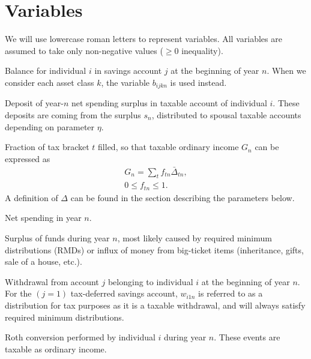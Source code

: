 \documentclass{report}[fleqn,12pt]
\begin{document}
\section{Variables}
We will use lowercase roman letters to represent variables. All variables are assumed
to take only non-negative values ($\ge 0$ inequality).
\begin{description}[leftmargin=4em,style=multiline]
\item [$b_{ijn}$]
	Balance for individual $i$ in savings account $j$ at the beginning of year $n$.
	When we consider each asset class $k$, the variable $b_{ijkn}$ is used instead.
\item [$d_{in}$]
	Deposit of year-$n$ net spending surplus in taxable account of individual $i$.
	These deposits are coming from the surplus $s_n$, distributed to
	spousal taxable accounts depending on parameter $\eta$.
\item [$f_{t n}$]
	Fraction of tax bracket $t$ filled, so that taxable ordinary income $G_n$ can be expressed as
	\begin{eqnarray}
		\label{Eq:Tx1}
		G_n = \sum_t f_{t n}\bar{\Delta}_{t n},\\
		0 \leq f_{t n} \leq 1.
	\end{eqnarray}
	A definition of $\Delta$ can be found in the section describing the parameters below. 
\item [$g_n$]
	Net spending in year $n$.
\item [$s_{n}$]
	Surplus of funds during year $n$, most likely caused by required minimum distributions (RMDs)
	or influx of money from big-ticket items (inheritance, gifts, sale of a house, etc.).
\item [$w_{ijn}$]
	Withdrawal from account $j$ belonging to individual $i$ at the beginning of year $n$.
	For the $(j=1)$ tax-deferred savings account, $w_{i1n}$ is referred to as a distribution for
	tax purposes as it is a taxable withdrawal, and will always satisfy required minimum distributions.
\item [$x_{in}$]
	Roth conversion performed by individual $i$ during year $n$.
	These events are taxable as ordinary income.
\end{description}
\end{document}
